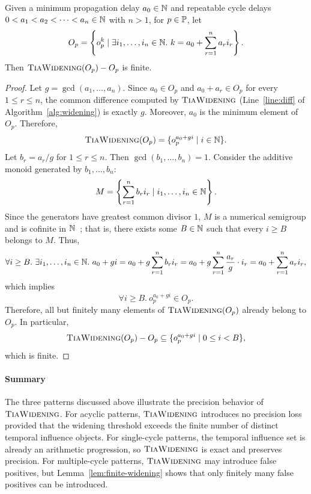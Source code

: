 \begin{lemma}\label{lem:finite-widening}
    Given a minimum propagation delay $a_0 \in \mathbb{N}$ and repeatable cycle delays $0 < a_1 < a_2 < \dots < a_n \in \mathbb{N}$ with $n > 1$, for $p \in \mathbb{P}$, let
    \[
    O_p = \left\{ o_p^k \mid  \exists i_1,\dots,i_n \in \mathbb{N}.\ k = a_0 + \sum_{r=1}^{n} a_r i_r \right\}.
    \]
    Then $\textsc{TiaWidening}(O_p) - O_p$ is finite.
\end{lemma}
\begin{proof}
    Let $g = \gcd(a_1,\dots,a_n)$.
    Since $a_0 \in O_p$ and $a_0+a_r \in O_p$ for every $1 \le r \le n$, the common difference computed by $\textsc{TiaWidening}$ (Line~\ref{line:diff} of Algorithm~\ref{alg:widening}) is exactly $g$.
    Moreover, $a_0$ is the minimum element of $O_p$.
    Therefore,
    \[
    \textsc{TiaWidening}(O_p) = \{ o_p^{a_0+gi} \mid i\in\mathbb{N} \}.
    \]
    Let $b_r=a_r/g$ for $1\le r\le n$.
    Then $\gcd(b_1,\dots,b_n)=1$.
    Consider the additive monoid generated by $b_1,\dots,b_n$:
    \[
    M = \left\{ \sum_{r=1}^{n} b_r i_r \mid i_1,\dots,i_n\in\mathbb{N} \right\}.
    \]
    Since the generators have greatest common divisor $1$, $M$ is a numerical semigroup and is cofinite in $\mathbb{N}$~\cite{rosales_numerical_2009};
    that is, there exists some $B\in\mathbb{N}$ such that every $i\ge B$ belongs to $M$.
    Thus,
    \[
    \forall i \ge B.\ \exists i_1,\dots,i_n\in\mathbb{N}.\ a_0+gi = a_0+g\sum_{r=1}^{n}b_r i_r = a_0+g\sum_{r=1}^{n}\frac{a_r}{g}\cdot i_r = a_0+\sum_{r=1}^{n}a_r i_r,
    \]
    which implies
    \[
    \forall i \ge B.\ o_p^{a_0+gi}\in O_p.
    \]
    Therefore, all but finitely many elements of $\textsc{TiaWidening}(O_p)$ already belong to $O_p$.
    In particular,
    \[
    \textsc{TiaWidening}(O_p) - O_p \subseteq \{ o_p^{a_0+gi} \mid 0\le i<B \},
    \]
    which is finite.
\end{proof}

\paragraph{Summary}
The three patterns discussed above illustrate the precision behavior of $\textsc{TiaWidening}$.
For acyclic patterns, $\textsc{TiaWidening}$ introduces no precision loss provided that the widening threshold exceeds the finite number of distinct temporal influence objects.
For single-cycle patterns, the temporal influence set is already an arithmetic progression, so $\textsc{TiaWidening}$ is exact and preserves precision.
For multiple-cycle patterns, $\textsc{TiaWidening}$ may introduce false positives, but Lemma~\ref{lem:finite-widening} shows that only finitely many false positives can be introduced.
